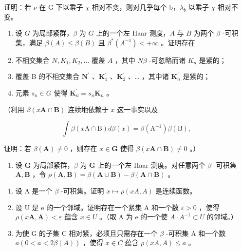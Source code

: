 证明：若 \(\nu\) 在 G 下以乘子 \(\chi\) 相对不变，则对几乎每个 b，\(\lambda_{b}\) 以乘子 \(\chi\) 相对不变。

\begin{enumerate}
\def\labelenumi{\arabic{enumi})}
\setcounter{enumi}{8}
\item
  设 \(G\) 为局部紧群，\(\beta\) 为 \(G\) 上的一个左 Haar 测度，\(A\) 与 \(B\) 为两个 \(\beta\) -可积集，满足 \(\beta(A) \leqslant \beta(B)\) 且 \(\beta^{*}(A^{-1}) < +\infty\) 。证明存在
\item
  不相交集合 \(N, K_{1}, K_{2}, \ldots\) 覆盖 \(A\) ，其中 \(N \beta\) -可忽略而诸 \(K_{n}\) 是紧的；
\item
  覆盖 B 的不相交集合 \(\mathbf{N}^{\prime}\) 、\(\mathbf{K}_1^{\prime}\) 、\(\mathbf{K}_2^{\prime}\) 、\ldots{} ，其中诸 \(\mathbf{K}_n^{\prime}\) 是紧的；\\
\item
  元素 \(s_n \in G\) 使得 \(\mathbf{K}_n^{\prime} = s_n\mathbf{K}_n\) 。
\end{enumerate}

（利用 \(\beta (x\mathbf{A}\cap \mathbf{B})\) 连续地依赖于 \(x\) 这一事实以及

\[
\int \beta (x \mathrm{A} \cap \mathrm{B}) d \beta (x) = \beta (\mathrm{A} ^ {- 1}) \beta (\mathrm{B}),
\]

证明：若 \(\beta (\mathbf{A})\neq 0\) ，则存在 \(x\in \mathbf{G}\) 使得 \(\beta (x\mathbf{A}\cap \mathbf{B})\neq 0\) 。）

\begin{enumerate}
\def\labelenumi{\arabic{enumi})}
\setcounter{enumi}{9}
\tightlist
\item
  设 \(\mathbf{G}\) 为局部紧群，\(\beta\) 为 \(\mathbf{G}\) 上的一个左 Haar 测度。对任意两个 \(\beta\) -可积集 \(\mathbf{A}, \mathbf{B}\) ，令 \(\rho(\mathbf{A}, \mathbf{B}) = \beta(\mathbf{A} \cup \mathbf{B}) - \beta(\mathbf{A} \cap \mathbf{B})\) 。
\end{enumerate}

\begin{enumerate}
\def\labelenumi{\alph{enumi})}
\item
  设 A 是一个 \(\beta\) -可积集。证明 \(x \mapsto \rho(xA, A)\) 是连续函数。
\item
  设 U 是 e 的一个邻域。证明存在一个紧集 A 和一个数 \(\varepsilon > 0\) ，使得 \(\rho(x\mathbf{A}, \mathbf{A}) < \varepsilon\) 蕴含 \(x \in U\) 。（取 A 为 e 的一个使 \(A \cdot A^{-1} \subset U\) 的邻域。）
\item
  为使 G 的子集 C 相对紧，必须且只需存在一个 \(\beta\) -可积集 A 和一个数 \(a (0 < a < 2\beta(A))\) ，使得 \(x \in C\) 蕴含 \(\rho(xA, A) \leqslant a\) 。
\end{enumerate}

